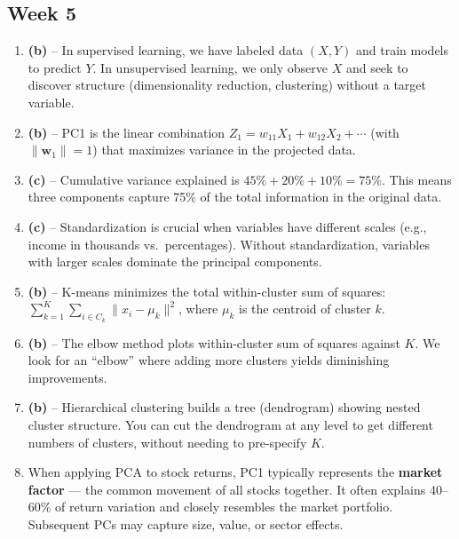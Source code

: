 \documentclass[11pt]{article}
\begin{document}
\subsection*{Week 5}

\begin{enumerate}[label=\textbf{\arabic*.}, leftmargin=*, itemsep=6pt, start=10]
  \item \textbf{(b)} -- In supervised learning, we have labeled data $(X, Y)$ and train models to predict $Y$. In unsupervised learning, we only observe $X$ and seek to discover structure (dimensionality reduction, clustering) without a target variable.
  
  \item \textbf{(b)} -- PC1 is the linear combination $Z_1 = w_{11}X_1 + w_{12}X_2 + \cdots$ (with $\|\mathbf{w}_1\| = 1$) that maximizes variance in the projected data.
  
  \item \textbf{(c)} -- Cumulative variance explained is $45\% + 20\% + 10\% = 75\%$. This means three components capture 75\% of the total information in the original data.
  
  \item \textbf{(c)} -- Standardization is crucial when variables have different scales (e.g., income in thousands vs.\ percentages). Without standardization, variables with larger scales dominate the principal components.
  
  \item \textbf{(b)} -- K-means minimizes the total within-cluster sum of squares: $\sum_{k=1}^{K} \sum_{i \in C_k} \|x_i - \mu_k\|^2$, where $\mu_k$ is the centroid of cluster $k$.
  
  \item \textbf{(b)} -- The elbow method plots within-cluster sum of squares against $K$. We look for an ``elbow'' where adding more clusters yields diminishing improvements.
  
  \item \textbf{(b)} -- Hierarchical clustering builds a tree (dendrogram) showing nested cluster structure. You can cut the dendrogram at any level to get different numbers of clusters, without needing to pre-specify $K$.
  
  \item When applying PCA to stock returns, PC1 typically represents the \textbf{market factor} --- the common movement of all stocks together. It often explains 40--60\% of return variation and closely resembles the market portfolio. Subsequent PCs may capture size, value, or sector effects.
\end{enumerate}
\end{document}
